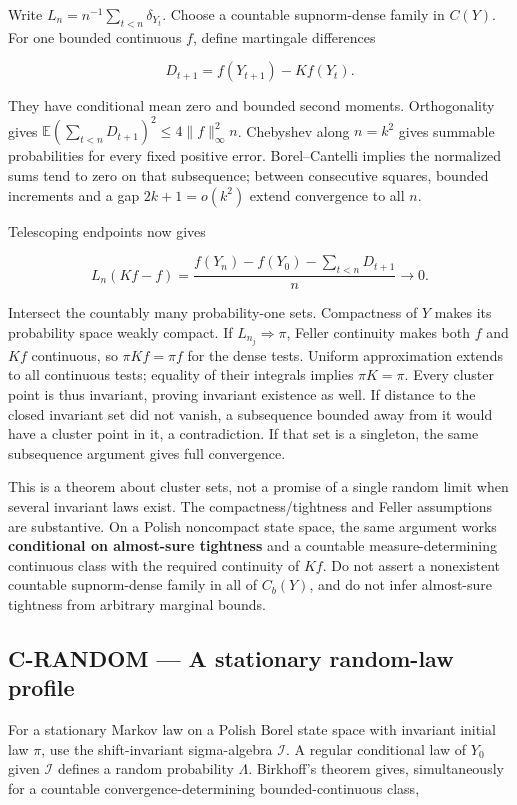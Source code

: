 \documentclass[
  11pt,
  a4paper,
]{article}
\begin{document}
Write \(L_n=n^{-1}\sum_{t<n}\delta_{Y_t}\). Choose a countable
supnorm-dense family in \(C(Y)\). For one bounded continuous \(f\),
define martingale differences

\[D_{t+1}=f(Y_{t+1})-Kf(Y_t).\]

They have conditional mean zero and bounded second moments.
Orthogonality gives
\(\mathbb E(\sum_{t<n}D_{t+1})^2\le4\|f\|_\infty^2n\). Chebyshev along
\(n=k^2\) gives summable probabilities for every fixed positive error.
Borel--Cantelli implies the normalized sums tend to zero on that
subsequence; between consecutive squares, bounded increments and a gap
\(2k+1=o(k^2)\) extend convergence to all \(n\).

Telescoping endpoints now gives

\[L_n(Kf-f)=\frac{f(Y_n)-f(Y_0)-\sum_{t<n}D_{t+1}}n\longrightarrow0.\]

Intersect the countably many probability-one sets. Compactness of \(Y\)
makes its probability space weakly compact. If
\(L_{n_j}\Rightarrow\pi\), Feller continuity makes both \(f\) and \(Kf\)
continuous, so \(\pi Kf=\pi f\) for the dense tests. Uniform
approximation extends to all continuous tests; equality of their
integrals implies \(\pi K=\pi\). Every cluster point is thus invariant,
proving invariant existence as well. If distance to the closed invariant
set did not vanish, a subsequence bounded away from it would have a
cluster point in it, a contradiction. If that set is a singleton, the
same subsequence argument gives full convergence.

This is a theorem about cluster sets, not a promise of a single random
limit when several invariant laws exist. The compactness/tightness and
Feller assumptions are substantive. On a Polish noncompact state space,
the same argument works \textbf{conditional on almost-sure tightness}
and a countable measure-determining continuous class with the required
continuity of \(Kf\). Do not assert a nonexistent countable
supnorm-dense family in all of \(C_b(Y)\), and do not infer almost-sure
tightness from arbitrary marginal bounds.

\subsection{C-RANDOM --- A stationary random-law
profile}\label{c-random-a-stationary-random-law-profile}

For a stationary Markov law on a Polish Borel state space with invariant
initial law \(\pi\), use the shift-invariant sigma-algebra
\(\mathcal I\). A regular conditional law of \(Y_0\) given
\(\mathcal I\) defines a random probability \(\Lambda\). Birkhoff's
theorem gives, simultaneously for a countable convergence-determining
bounded-continuous class,
\end{document}
